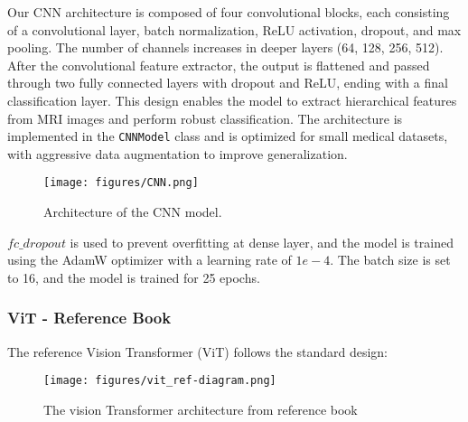 \documentclass[twocolumn,superscriptaddress,aps]{revtex4-1}
\begin{document}
Our CNN architecture is composed of four convolutional blocks, each consisting of a convolutional layer, batch normalization, ReLU activation, dropout, and max pooling. The number of channels increases in deeper layers (64, 128, 256, 512). After the convolutional feature extractor, the output is flattened and passed through two fully connected layers with dropout and ReLU, ending with a final classification layer. This design enables the model to extract hierarchical features from MRI images and perform robust classification. The architecture is implemented in the \texttt{CNNModel} class and is optimized for small medical datasets, with aggressive data augmentation to improve generalization.


\begin{figure}[htbp]
    \centering
    \texttt{[image: figures/CNN.png]}
    \caption{Architecture of the CNN model.}
    \label{Figure 3:CNN_Architecture}
\end{figure}

$fc\_dropout$ is used to prevent overfitting at dense layer, and the model is trained using the AdamW optimizer with a learning rate of $1e-4$. The batch size is set to 16, and the model is trained for 25 epochs.

\subsubsection{ViT - Reference Book}\label{section:basic-vit}

The reference Vision Transformer (ViT) follows the standard design:

\begin{figure}[h!]
    \centering
    \texttt{[image: figures/vit\_ref-diagram.png]}
    \caption{The vision Transformer architecture from reference book}
    \label{fig:enter-label}
\end{figure}
\end{document}
